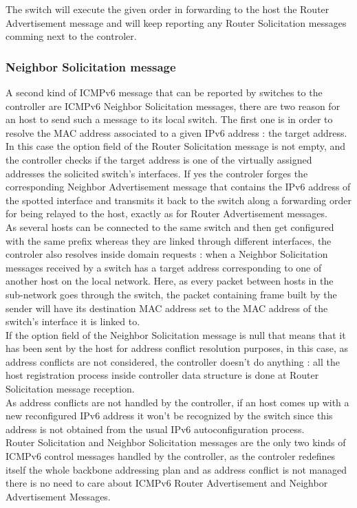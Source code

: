 \documentclass{article}
\begin{document}
The switch will execute the given order in forwarding to the host the
Router Advertisement message and will keep reporting any Router
Solicitation messages comming next to the controler.\\

\subsubsection{Neighbor Solicitation message}

A second kind of ICMPv6 message that can be reported by switches to
the controller are ICMPv6 Neighbor Solicitation messages, there are
two reason for an host to send such a message to its local switch. The
first one is in order to resolve the MAC address associated to a given
IPv6 address : the target address. In this case the option field of
the Router Solicitation message is not empty, and the controller
checks if the target address is one of the virtually assigned
addresses the solicited switch's interfaces. If yes the controler
forges the corresponding Neighbor Advertisement message that contains
the IPv6 address of the spotted interface and transmits it back to the
switch along a forwarding order for being relayed to the host, exactly
as for Router Advertisement messages.\\
\newline
As several hosts can be connected to the same switch and then get
configured with the same prefix whereas they are linked through
different interfaces, the controler also resolves inside domain
requests : when a Neighbor Solicitation messages received by a switch
has a target address corresponding to one of another host on the local
network. Here, as every packet between hosts in the sub-network goes
through the switch, the packet containing frame built by the sender
will have its destination MAC address set to the MAC address of the
switch's interface it is linked to.\\
\newline
If the option field of the Neighbor Solicitation message is null that
means that it has been sent by the host for address conflict
resolution purposes, in this case, as address conflicts are not
considered, the controller doesn't do anything : all the host
registration process inside controller data structure is done at
Router Solicitation message reception.\\
\newline
As address conflicts are not handled by the controller, if an host
comes up with a new reconfigured IPv6 address it won't be recognized
by the switch since this address is not obtained from the usual IPv6
autoconfiguration process.\\
\newline
Router Solicitation and Neighbor Solicitation messages are the only
two kinds of ICMPv6 control messages handled by the controller, as the
controler redefines itself the whole backbone addressing plan and as
address conflict is not managed there is no need to care about ICMPv6
Router Advertisement and Neighbor Advertisement Messages.
\end{document}
